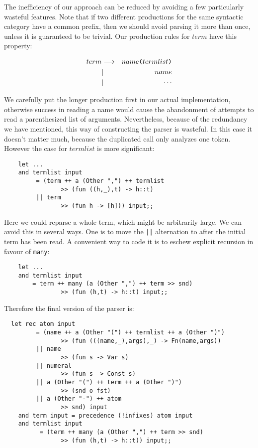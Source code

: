 The inefficiency of our approach can be reduced by avoiding a few particularly
wasteful features. Note that if two different productions for the same
syntactic category have a common prefix, then we should avoid parsing it more
than once, unless it is guaranteed to be trivial. Our production rules for
$term$ have this property:

\begin{eqnarray*}
term     & \goesto & name{\verb!(!} termlist {\verb!)!}         \\
         & |       & name                                       \\
         & |       & \cdots
\end{eqnarray*}

We carefully put the longer production first in our actual implementation,
otherwise success in reading a name would cause the abandonment of attempts to
read a parenthesized list of arguments. Nevertheless, because of the
redundancy we have mentioned, this way of constructing the parser is wasteful.
In this case it doesn't matter much, because the duplicated call only analyzes
one token. However the case for $termlist$ is more significant:

\begin{boxed}\begin{lstlisting}
    let ...
    and termlist input
         = (term ++ a (Other ",") ++ termlist
                >> (fun ((h,_),t) -> h::t)
         || term
                >> (fun h -> [h])) input;;
\end{lstlisting}\end{boxed}

Here we could reparse a whole term, which might be arbitrarily large. We can
avoid this in several ways. One is to move the {\verb!||!} alternation to after
the initial term has been read. A convenient way to code it is to eschew
explicit recursion in favour of {\tt many}:

\begin{boxed}\begin{lstlisting}
    let ...
    and termlist input
        = term ++ many (a (Other ",") ++ term >> snd)
                >> (fun (h,t) -> h::t) input;;
\end{lstlisting}\end{boxed}

\noindent Therefore the final version of the parser is:

\begin{boxed}\begin{lstlisting}
  let rec atom input
         = (name ++ a (Other "(") ++ termlist ++ a (Other ")")
                >> (fun (((name,_),args),_) -> Fn(name,args))
         || name
                >> (fun s -> Var s)
         || numeral
                >> (fun s -> Const s)
         || a (Other "(") ++ term ++ a (Other ")")
                >> (snd o fst)
         || a (Other "-") ++ atom
                >> snd) input
    and term input = precedence (!infixes) atom input
    and termlist input
          = (term ++ many (a (Other ",") ++ term >> snd)
                >> (fun (h,t) -> h::t)) input;;
\end{lstlisting}\end{boxed}

